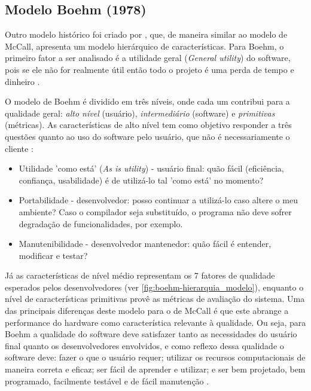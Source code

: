\documentclass[
	12pt,				%
	openright,			%
	oneside,			%
	a4paper,			%
	english,			%
	brazil,				%
	]{abntex2}
\begin{document}
\subsection{Modelo Boehm (1978)}

Outro modelo histórico foi criado por , que, de maneira similar ao modelo de McCall, apresenta um modelo hierárquico de características. Para Boehm, o primeiro fator a ser analisado é a utilidade geral (\emph{General utility}) do software, pois se ele não for realmente útil então todo o projeto é uma perda de tempo e dinheiro \cite{PFLEEGER2010}.

O modelo de Boehm é dividido em três níveis, onde cada um contribui para a qualidade geral: \emph{alto nível} (usuário), \emph{intermediário} (software) e \emph{primitivas} (métricas). As características de alto nível tem como objetivo responder a três questões quanto ao uso do software pelo usuário, que não é necessariamente o cliente \cite{berander2005}:

\begin{itemize}
    \item Utilidade 'como está' (\emph{As is utility}) - usuário final: quão fácil (eficiência, confiança, usabilidade) é de utilizá-lo tal 'como está' no momento?
    \item Portabilidade - desenvolvedor: posso continuar a utilizá-lo caso altere o meu ambiente? Caso o compilador seja substituído, o programa não deve sofrer degradação de funcionalidades, por exemplo.
    \item Manutenibilidade - desenvolvedor mantenedor: quão fácil é entender, modificar e testar?
\end{itemize}

Já as características de nível médio representam os 7 fatores de qualidade esperados pelos desenvolvedores (ver \autoref{fig:boehm-hierarquia_modelo}), enquanto o nível de características primitivas provê as métricas de avaliação do sistema. Uma das principais diferenças deste modelo para o de McCall é que este abrange a performance do hardware como característica relevante à qualidade. Ou seja, para Boehm a qualidade do software deve satisfazer tanto as necessidades do usuário final quanto os desenvolvedores envolvidos, e como reflexo dessa qualidade o software deve: fazer o que o usuário requer; utilizar os recursos computacionais de maneira correta e eficaz; ser fácil de aprender e utilizar; e ser bem projetado, bem programado, facilmente testável e de fácil manutenção \cite{PFLEEGER2010}.
\end{document}
